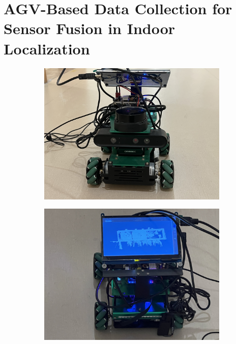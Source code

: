 \documentclass[12pt,a4paper]{article}
\numberwithin{equation}{section}
\begin{document}
\section{AGV-Based Data Collection for Sensor Fusion in Indoor Localization}
\begin{figure}[H]
  \centering
  \begin{subfigure}[b]{0.5\textwidth}
    \centering
    \includegraphics[width=\textwidth]{images/test/1.jpg}
    \caption{}
  \end{subfigure} \hfill
  \begin{subfigure}[b]{0.5\textwidth}
    \centering
    \includegraphics[width=\textwidth]{images/test/2.jpg}
    \caption{}
  \end{subfigure}

\end{figure}
\end{document}
